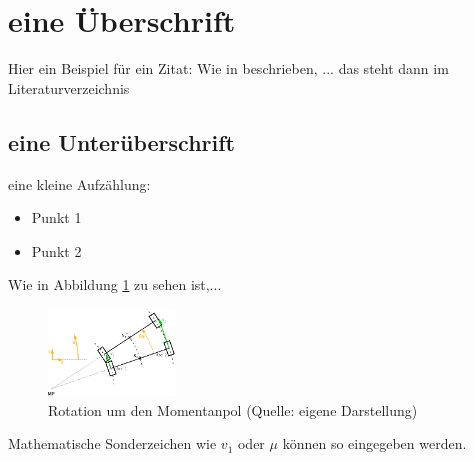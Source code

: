 

\renewcommand{\autoren}{Stephan Morongowski}
\newpage

\section{eine Überschrift}

Hier ein Beispiel für ein Zitat: Wie in \cite{bildungAtmosphaere} beschrieben, ... das steht dann im Literaturverzeichnis

\subsection{eine Unterüberschrift}
eine kleine Aufzählung:
\begin{itemize}
\item Punkt 1
\item Punkt 2
\end{itemize}

Wie in Abbildung \ref{kurvenkinematik} zu sehen ist,...

\begin{figure}[h]  %
\centering\includegraphics[width=0.3\textwidth]{images/Kurvenkinematic.eps}
\caption{Rotation um den Momentanpol \newline (Quelle: eigene Darstellung)}
\label{kurvenkinematik}
\end{figure}

Mathematische Sonderzeichen wie \(v_1\) oder \(\mu\) können so eingegeben werden.

